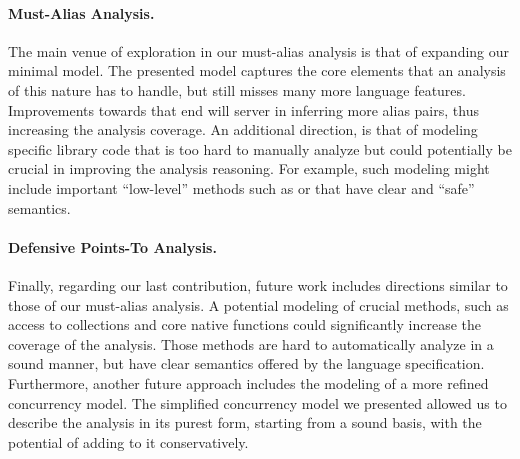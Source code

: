 \paragraph{Must-Alias Analysis.}
The main venue of exploration in our must-alias analysis is that of expanding our minimal model. The presented model captures the core elements that an analysis of this nature has to handle, but still misses many more language features. Improvements towards that end will server in inferring more alias pairs, thus increasing the analysis coverage. An additional direction, is that of modeling specific library code that is too hard to manually analyze but could potentially be crucial in improving the analysis reasoning. For example, such modeling might include important ``low-level'' methods such as  or  that have clear and ``safe'' semantics.

\paragraph{Defensive Points-To Analysis.}
Finally, regarding our last contribution, future work includes directions similar to those of our must-alias analysis. A potential modeling of crucial methods, such as access to collections and core native functions could significantly increase the coverage of the analysis. Those methods are hard to automatically analyze in a sound manner, but have clear semantics offered by the language specification. Furthermore, another future approach includes the modeling of a more refined concurrency model. The simplified concurrency model we presented allowed us to describe the analysis in its purest form, starting from a sound basis, with the potential of adding to it conservatively.